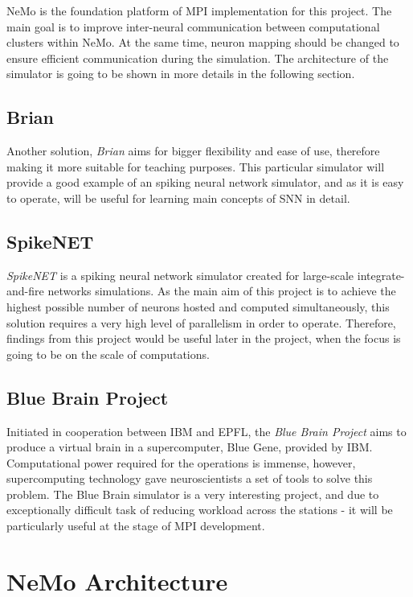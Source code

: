 NeMo is the foundation platform of MPI implementation for this project. The main goal is to improve inter-neural communication between computational clusters within NeMo.
At the same time, neuron mapping should be changed to ensure efficient communication during the simulation. The architecture of the simulator is going to be shown in more details in the following section.

\subsection{Brian}

Another solution, \emph{Brian} aims for bigger flexibility and ease of use, therefore making it more suitable for teaching purposes. \cite{Goodman2008} This
particular simulator will provide a good example of an spiking neural network simulator, and as it is easy to operate, will be useful for learning main concepts
of SNN in detail.

\subsection{SpikeNET}

\emph{SpikeNET} is a spiking neural network simulator created for large-scale integrate-and-fire networks simulations.\cite{ArnaudDelorme1999} As the main aim of this project is to
achieve the highest possible number of neurons hosted and computed simultaneously, this solution requires a very high level of parallelism in order to operate.
Therefore, findings from this project would be useful later in the project, when the focus is going to be on the scale of computations.

\subsection{Blue Brain Project}

Initiated in cooperation between IBM and EPFL, the \emph{Blue Brain Project} aims to produce a virtual brain in a supercomputer, Blue Gene, provided by IBM.\cite{BlueBrain} Computational power
required for the operations is immense, however, supercomputing technology gave neuroscientists a set of tools to solve this problem. The Blue Brain simulator is
a very interesting project, and due to exceptionally difficult task of reducing workload across the stations - it will be particularly useful at the stage of MPI development.

\section{NeMo Architecture}

